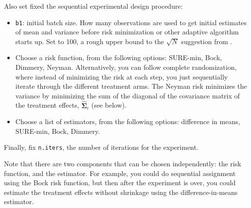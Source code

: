 \documentclass{article}
\newcommand{\bsSig}{\boldsymbol  \Sigma}
\begin{document}
Also set fixed the sequential experimental design procedure:
\begin{itemize}
    \item \texttt{b1}: initial batch size. How many observations are used to get initial estimates of mean and variance before risk minimization or other adaptive algorithm starts up. Set to 100, a rough upper bound to the $\sqrt{N}$ suggestion from \cite{zhao2023adaptive}.
    \item Choose a risk function, from the following options: SURE-min, Bock, Dimmery, Neyman. Alternatively, you can follow complete randomization, where instead of minimizing the risk at each step, you just sequentially iterate through the different treatment arms. The Neyman risk minimizes the variance by minimizing the sum of the diagonal of the covariance matrix of the treatment effects, $\hat{\bsSig}_i$ (see below).
    \item Choose a list of estimators, from the following options: difference in means, SURE-min, Bock, Dimmery.
\end{itemize}

Finally, fix \texttt{n.iters}, the number of iterations for the experiment.

Note that there are two components that can be chosen independently: the risk function, and the estimator. For example, you could do sequential assignment using the Bock risk function, but then after the experiment is over, you could estimate the treatment effects without shrinkage using the difference-in-means estimator. 
\end{document}
